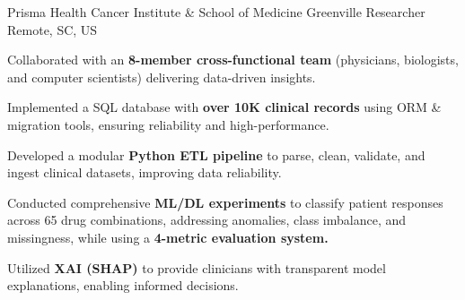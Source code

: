 
\vspace*{-0.2cm}

\begin{cventries}


\cventry
    {Prisma Health Cancer Institute \hspace{0.1cm} \& \hspace{0.1cm} School of Medicine Greenville}
    {Researcher}
    {}
    {Remote, SC, US}
    {
        \begin{cvitemsfree}
            \item{Collaborated with an \textbf{8-member cross-functional team} (physicians, biologists, and computer scientists) delivering data-driven insights.}
            \item{Implemented a SQL database with \textbf{over 10K clinical records} using ORM \& migration tools, ensuring reliability and high-performance.} %
            \item{Developed a modular \textbf{Python ETL pipeline} to parse, clean, validate, and ingest clinical datasets, improving data reliability.}
            \item{Conducted comprehensive \textbf{ML/DL experiments} to classify patient responses across 65 drug combinations, addressing anomalies, class imbalance, and missingness, while using a \textbf{4-metric evaluation system.}}
            \item{Utilized \textbf{XAI (SHAP)} to provide clinicians with transparent model explanations, enabling informed decisions.}
        \end{cvitemsfree}
    }

\vspace*{0.2cm}


\end{cventries}
